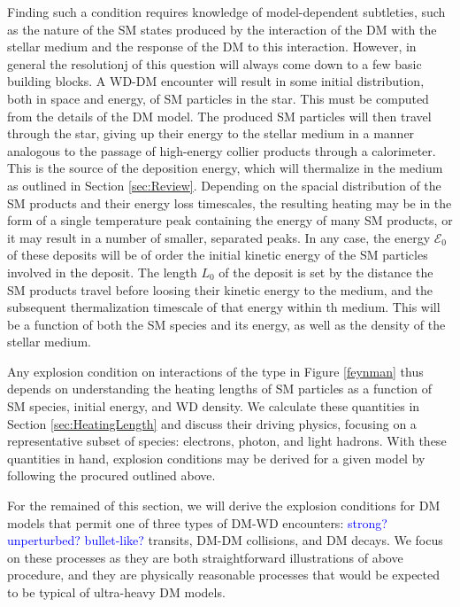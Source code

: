 \documentclass[twocolumn,showpacs,preprintnumbers,amsmath,amssymb,prd]{revtex4}
\begin{document}
Finding such a condition requires knowledge of model-dependent subtleties, such as the nature of the SM states produced by the interaction of the DM with the stellar medium and the response of the DM to this interaction.  However, in general the resolutionj of this question will always come down to a few basic building blocks.  A WD-DM encounter will result in some initial distribution, both in space and energy, of SM particles in the star.  This must be computed from the details of the DM model.  The produced SM particles will then travel through the star, giving up their energy to the stellar medium in a manner analogous to the passage of high-energy collier products through a calorimeter.  This is the source of the deposition energy, which will thermalize in the medium as outlined in Section \ref{sec:Review}.  Depending on the spacial distribution of the SM products and their energy loss timescales, the resulting heating may be in the form of a single temperature peak containing the energy of many SM products, or it may result in a number of smaller, separated peaks.  In any case, the energy $\mathcal{E}_0$ of these deposits will be of order the initial kinetic energy of the SM particles involved in the deposit.  The length $L_0$ of the deposit is set by the distance the SM products travel before loosing their kinetic energy to the medium, and the subsequent thermalization timescale of that energy within th medium.  This will be a function of both the SM species and its energy, as well as the density of the stellar medium.

Any explosion condition on interactions of the type in Figure \ref{feynman} thus depends on understanding the heating lengths of SM particles as a function of SM species, initial energy, and WD density.  We calculate these quantities in Section \ref{sec:HeatingLength} and discuss their driving physics, focusing on a representative subset of species: electrons, photon, and light hadrons. With these quantities in hand, explosion conditions may be derived for a given model by following the procured outlined above.

For the remained of this section, we will derive the explosion conditions for DM models that permit one of three types of DM-WD encounters: \textcolor{blue}{strong? unperturbed? bullet-like?} transits, DM-DM collisions, and DM decays.  We focus on these processes as they are both straightforward illustrations of above procedure, and they are physically reasonable processes that would be expected to be typical of ultra-heavy DM models.
\end{document}
